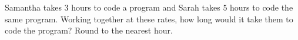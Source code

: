 Samantha takes $3$ hours to code a program and Sarah takes $5$ hours to code the same program. Working together at these rates, how long would it take them to code the program? Round to the nearest hour.

